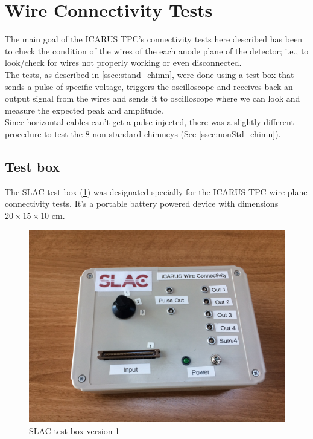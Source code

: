 \section{Wire Connectivity Tests}
\label{sec:TheTest}

The main goal of the ICARUS TPC's connectivity tests here described has been to check the condition of the wires of the each anode plane of the detector; i.e., to look/check for wires not properly working or even disconnected. \\

The tests, as described in \cref{ssec:stand_chimn}, were done using a test box that sends a pulse of specific voltage, triggers the oscilloscope and receives back an output signal from the wires and sends it to oscilloscope where we can look and measure the expected peak and amplitude.\\

Since horizontal cables can't get a pulse injected, there was a slightly different procedure to test the 8 non-standard chimneys (See \cref{ssec:nonStd_chimn}). 


\subsection{Test box}
\label{ssec:TestBox}

The SLAC test box (\cref{fig:TestBox}) was designated specially for the ICARUS TPC wire plane connectivity tests. It's a portable battery powered device with dimensions $20\times 15\times 10$ cm.\\

\begin{figure}[htb]
\centering
\includegraphics[width=0.8\linewidth]{fig/box1}
\caption{\label{fig:TestBox}SLAC test box version 1}
\end{figure}

